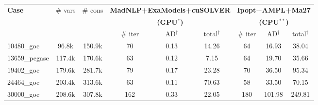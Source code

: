 \begin{tabular}{|l|c|c|ccc|ccc|}
  \hline
  \multirow{3}{*}{\textbf{Case}}
  & \multirow{3}{*}{\# vars}
  & \multirow{3}{*}{\# cons}
  & \multicolumn{3}{c|}{\textbf{MadNLP+ExaModels+cuSOLVER}}
  & \multicolumn{3}{c|}{\textbf{Ipopt+AMPL+Ma27}}
  \\
  & & &\multicolumn{3}{c|}{\textbf{(GPU$^*$)}} &\multicolumn{3}{c|}{\textbf{(CPU$^{**}$)}}
  \\
  \cline{4-9}
  & & 
  & \quad \# iter \quad& \quad AD$^\dag$  \quad&  \quad total$^\dag$ \quad
    & \quad \# iter \quad& \quad AD$^\dag$  \quad&  \quad total$^\dag$ \quad
  \\
  \hline
  10480\_goc 
  &  96.8k
  & 150.9k
  & 70 
  &  0.13
  & 14.26
    & 64 
      & 16.93
                                               & 38.04
  \\

  13659\_pegase 
  & 117.4k
  & 170.6k
  & 63 
  &  0.12
  &  7.15
    & 64 
      & 19.70
                                               & 35.66
  \\

  19402\_goc 
  & 179.6k
  & 281.7k
  & 79 
  &  0.17
  & 23.28
    & 70 
      & 36.50
                                               & 95.34
  \\

  24464\_goc 
  & 203.4k
  & 313.6k
  & 63 
  &  0.11
  & 70.63
    & 58 
      & 33.50
                                               & 70.15
  \\

  30000\_goc 
  & 208.6k
  & 307.8k
  & 162 
  &  0.33
  & 22.05
    & 180 
      & 101.98
                                               & 249.81
  \\
    \hline  
\end{tabular}